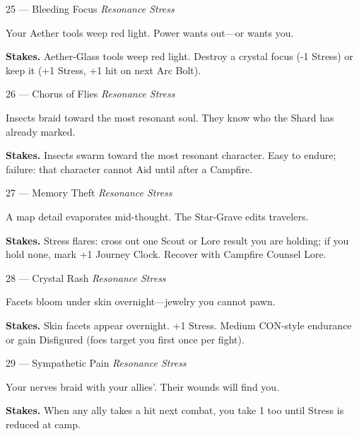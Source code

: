 \begin{encounterentry}{25 --- Bleeding Focus}
\textit{Resonance Stress}

Your Aether tools weep red light. Power wants out---or wants you.

\textbf{Stakes.} Aether-Glass tools weep red light. Destroy a crystal focus (-1 Stress) or keep it (+1 Stress, +1 hit on next Arc Bolt).
\end{encounterentry}

\begin{encounterentry}{26 --- Chorus of Flies}
\textit{Resonance Stress}

Insects braid toward the most resonant soul. They know who the Shard has already marked.

\textbf{Stakes.} Insects swarm toward the most resonant character. Easy to endure; failure: that character cannot Aid until after a Campfire.
\end{encounterentry}

\begin{encounterentry}{27 --- Memory Theft}
\textit{Resonance Stress}

A map detail evaporates mid-thought. The Star-Grave edits travelers.

\textbf{Stakes.} Stress flares: cross out one Scout or Lore result you are holding; if you hold none, mark +1 Journey Clock. Recover with Campfire Counsel Lore.
\end{encounterentry}

\begin{encounterentry}{28 --- Crystal Rash}
\textit{Resonance Stress}

Facets bloom under skin overnight---jewelry you cannot pawn.

\textbf{Stakes.} Skin facets appear overnight. +1 Stress. Medium CON-style endurance or gain Disfigured (foes target you first once per fight).
\end{encounterentry}

\begin{encounterentry}{29 --- Sympathetic Pain}
\textit{Resonance Stress}

Your nerves braid with your allies'. Their wounds will find you.

\textbf{Stakes.} When any ally takes a hit next combat, you take 1 too until Stress is reduced at camp.
\end{encounterentry}


